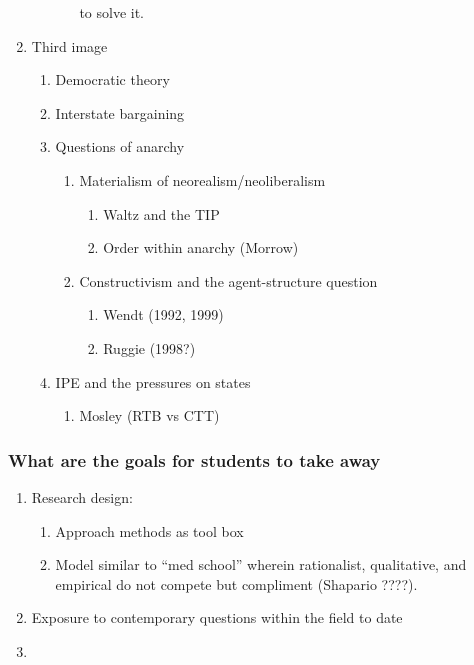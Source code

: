 \documentclass[11pt]{article}
\begin{document}
\begin{enumerate}
\begin{enumerate}
\begin{enumerate}
to solve it.
\end{enumerate}
\end{enumerate}
\item Third image
\begin{enumerate}
\item Democratic theory
\item Interstate bargaining
\item Questions of anarchy
\begin{enumerate}
\item Materialism of neorealism/neoliberalism
\begin{enumerate}
\item Waltz and the TIP
\item Order within anarchy (Morrow)
\end{enumerate}
\item Constructivism and the agent-structure question
\begin{enumerate}
\item Wendt (1992, 1999)
\item Ruggie (1998?)
\end{enumerate}
\end{enumerate}
\item IPE and the pressures on states
\begin{enumerate}
\item Mosley (RTB vs CTT)
\end{enumerate}
\end{enumerate}
\end{enumerate}
\subsubsection{What are the goals for students to take away}
\label{sec-5-2-2}
\begin{enumerate}
\item Research design:
\begin{enumerate}
\item Approach methods as tool box
\item Model similar to ``med school'' wherein rationalist, qualitative,
and empirical do not compete but compliment (Shapario ????).
\end{enumerate}
\item Exposure to contemporary questions within the field to date
\item 
\end{enumerate}
\end{document}
